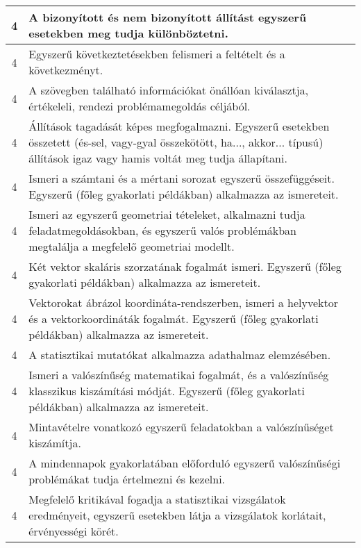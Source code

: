 \begin{longtable}{c | p{12cm} }
                                
                                          4 &  A bizonyított és nem bizonyított állítást egyszerű esetekben meg tudja különböztetni. \\ \hline
                                          4 &  Egyszerű következtetésekben felismeri a feltételt és a következményt. \\ \hline
                                          4 &  A szövegben található információkat önállóan kiválasztja, értékeleli, rendezi problémamegoldás céljából. \\ \hline
                                          4 &  Állítások tagadását képes megfogalmazni. Egyszerű esetekben összetett (és-sel, vagy-gyal összekötött, ha..., akkor... típusú) állítások igaz vagy hamis voltát meg tudja állapítani. \\ \hline
                                          4 &  Ismeri a számtani és a mértani sorozat egyszerű összefüggéseit. Egyszerű (főleg gyakorlati példákban) alkalmazza az ismereteit. \\ \hline
                                          4 &  Ismeri az egyszerű geometriai tételeket, alkalmazni tudja feladatmegoldásokban, és egyszerű valós problémákban megtalálja a megfelelő geometriai modellt. \\ \hline
                                          4 &  Két vektor skaláris szorzatának fogalmát ismeri.  Egyszerű (főleg gyakorlati példákban) alkalmazza az ismereteit. \\ \hline
                                          4 &  Vektorokat ábrázol koordináta-rendszerben, ismeri a helyvektor és a vektorkoordináták fogalmát. Egyszerű (főleg gyakorlati példákban) alkalmazza az ismereteit. \\ \hline
                                          4 &  A statisztikai mutatókat alkalmazza adathalmaz elemzésében. \\ \hline
                                          4 &  Ismeri a valószínűség matematikai fogalmát, és a valószínűség klasszikus kiszámítási módját. Egyszerű (főleg gyakorlati példákban) alkalmazza az ismereteit. \\ \hline
                                          4 &  Mintavételre vonatkozó egyszerű feladatokban a valószínűséget kiszámítja. \\ \hline
                                          4 &  A mindennapok gyakorlatában előforduló egyszerű valószínűségi problémákat tudja értelmezni és kezelni. \\ \hline
                                          4 &  Megfelelő kritikával fogadja a statisztikai vizsgálatok eredményeit, egyszerű esetekben látja a vizsgálatok korlátait, érvényességi körét. \\ \hline
                                      
                        \end{longtable}
            \clearpage

